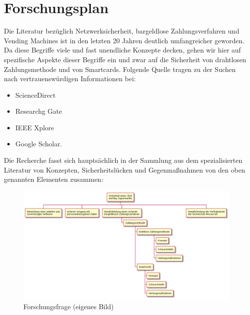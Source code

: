 \section{Forschungsplan}

Die Literatur bezüglich Netzwerksicherheit, bargeldlose Zahlungsverfahren und Vending Machines ist 
in den letzten 20 Jahren deutlich umfangreicher geworden. Da diese Begriffe viele und fast unendliche 
Konzepte decken, gehen wir hier auf spezifische Aspekte dieser Begriffe ein und zwar 
auf die Sicherheit von drahtlosen Zahlungsmethode und von Smartcards. Folgende Quelle tragen zu der
Suchen nach vertrauenswürdigen Informationen bei:

\begin{itemize}
    \item ScienceDirect
    \item Researchg Gate
    \item IEEE Xplore
    \item Google Scholar.
\end{itemize}

Die Recherche fasst sich hauptsächlich in der Sammlung aus dem spezialisierten Literatur von Konzepten,
Sicherheitslücken und Gegenmaßnahmen von den oben genannten Elementen zusammen:




\clearpage
{} 
\begin{landscape}\centering
\vspace*{\fill}
\begin{figure}[htpb]
  \centering
  \includegraphics[height=0.7\textheight, width=1.2\textwidth]{Bilder/Diagram2.png}
  \caption{Forschungsfrage (eigenes Bild)}
  \label{fig:diagramfrage}
\end{figure}
\vfill
\end{landscape}
\restoregeometry 
\clearpage

